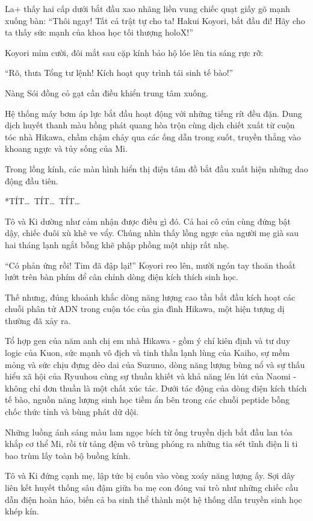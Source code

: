 \documentclass[../main.tex]{subfiles}
\begin{document}
La+ thấy hai cấp dưới bắt đầu xao nhãng liền vung chiếc quạt giấy gõ mạnh xuống bàn: ``Thôi ngay! Tất cả trật tự cho ta! Hakui Koyori, bắt đầu đi! Hãy cho ta thấy sức mạnh của khoa học tối thượng holoX!''

Koyori mỉm cười, đôi mắt sau cặp kính bảo hộ lóe lên tia sáng rực rỡ:

``Rõ, thưa Tổng tư lệnh! Kích hoạt quy trình tái sinh tế bào!''

Nàng Sói đồng cỏ gạt cần điều khiển trung tâm xuống.

Hệ thống máy bơm áp lực bắt đầu hoạt động với những tiếng rít đều đặn. Dung dịch huyết thanh màu hồng phát quang hòa trộn cùng dịch chiết xuất từ cuộn tóc nhà Hikawa, chầm chậm chảy qua các ống dẫn trong suốt, truyền thẳng vào khoang ngực và tủy sống của Mi.

Trong lồng kính, các màn hình hiển thị điện tâm đồ bắt đầu xuất hiện những dao động đầu tiên.

*TÍT\dots\ TÍT\dots\ TÍT\dots*

Tô và Ki dường như cảm nhận được điều gì đó. Cả hai cô cún cùng đứng bật dậy, chiếc đuôi xù khẽ ve vẩy. Chúng nhìn thấy lồng ngực của người mẹ già sau hai tháng lạnh ngắt bỗng khẽ phập phồng một nhịp rất nhẹ.

``Có phản ứng rồi! Tim đã đập lại!'' Koyori reo lên, mười ngón tay thoăn thoắt lướt trên bàn phím để cân chỉnh dòng điện kích thích sinh học.

Thế nhưng, đúng khoảnh khắc dòng năng lượng cao tần bắt đầu kích hoạt các chuỗi phân tử ADN trong cuộn tóc của gia đình Hikawa, một hiện tượng dị thường đã xảy ra.

Tổ hợp gen của năm anh chị em nhà Hikawa - gồm ý chí kiên định và tư duy logic của Kuon, sức mạnh vô địch và tinh thần lạnh lùng của Kaiho, sự mềm mỏng và sức chịu đựng dẻo dai của Suzuno, dòng năng lượng bùng nổ và sự thấu hiểu xã hội của Ryuuhou cùng sự thuần khiết và khả năng lén lút của Naomi - không chỉ đơn thuần là một chất xúc tác. Dưới tác động của dòng điện kích thích tế bào, nguồn năng lượng sinh học tiềm ẩn bên trong các chuỗi peptide bỗng chốc thức tỉnh và bùng phát dữ dội.

Những luồng ánh sáng màu lam ngọc bích từ ống truyền dịch bắt đầu lan tỏa khắp cơ thể Mi, rồi từ tảng đệm vô trùng phóng ra những tia sét tĩnh điện li ti bao trùm lấy toàn bộ buồng kính.

Tô và Ki đứng cạnh mẹ, lập tức bị cuốn vào vòng xoáy năng lượng ấy. Sợi dây liên kết huyết thống sâu đậm giữa ba mẹ con đóng vai trò như những chiếc cầu dẫn điện hoàn hảo, biến cả ba sinh thể thành một hệ thống dẫn truyền sinh học khép kín.
\end{document}
